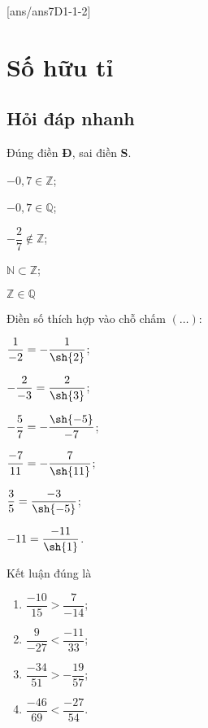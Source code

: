 [ans/ans7D1-1-2]
\section{Số hữu tỉ}
\subsection{Hỏi đáp nhanh}
\begin{ex}%
	Đúng điền \textbf{Đ}, sai điền \textbf{S}.
	\begin{enumEX}[a)]{2}
		\item {} $-0,7 \in \mathbb{Z}$;
		\item {} $-0,7 \in \mathbb{Q}$;
		\item {} $-\dfrac{2}{7} \notin \mathbb{Z}$;
		\item {} $\mathbb{N} \subset \mathbb{Z}$;
		\item {} $\mathbb{Z} \in \mathbb{Q}$
	\end{enumEX}
\end{ex}
\begin{ex}%
	Điền số thích hợp vào chỗ chấm $(\ldots)$:
	\begin{enumEX}[a)]{3}
		\item $\dfrac{1}{-2} = -\dfrac{1}{\sh{2}}$;
		\item $-\dfrac{2}{-3} = \dfrac{2}{\sh{3}}$;
		\item $-\dfrac{5}{7} = -\dfrac{\sh{-5}}{-7}$;
		\item $\dfrac{-7}{11} = -\dfrac{7}{\sh{11}}$;
		\item $\dfrac{3}{5} = \dfrac{-3}{\sh{-5}}$;
		\item $-11 = \dfrac{-11}{\sh{1}}$.
	\end{enumEX}
\end{ex}
\begin{ex}%
	Kết luận đúng là
	\begin{enumerate}
		\item {} $\dfrac{-10}{15}>\dfrac{7}{-14}$;
		\item {} $\dfrac{9}{-27}<\dfrac{-11}{33}$;
		\item {} $\dfrac{-34}{51}>-\dfrac{19}{57}$;
		\item {} $\dfrac{-46}{69} < \dfrac{-27}{54}$.
	\end{enumerate}
\end{ex}
